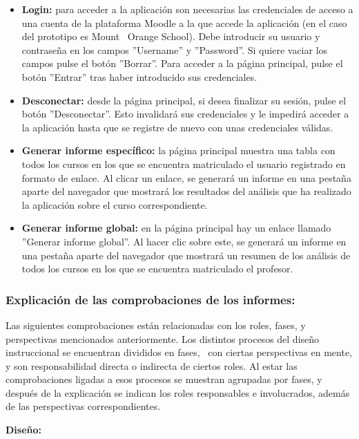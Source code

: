 \begin{itemize}
	\item
	\textbf{Login:} para acceder a la aplicación son necesarias las
	credenciales de acceso a una cuenta de la plataforma Moodle a la que
	accede la aplicación (en el caso del prototipo es Mount ~Orange
	School). Debe introducir su usuario y contraseña en los campos
	''Username'' y ''Password''. Si quiere vaciar los campos pulse el botón
	''Borrar''. Para acceder a la página principal, pulse el botón ''Entrar''
	tras haber introducido sus credenciales.
	\item
	\textbf{Desconectar:} desde la página principal, si desea finalizar su
	sesión, pulse el botón ''Desconectar''. Esto invalidará sus credenciales
	y le impedirá acceder a la aplicación hasta que se registre de nuevo
	con unas credenciales válidas.
	\item
	\textbf{Generar informe específico:} la página principal muestra una
	tabla con todos los cursos en los que se encuentra matriculado el
	usuario registrado en formato de enlace. Al clicar un enlace, se
	generará un informe en una pestaña aparte del navegador que mostrará
	los resultados del análisis que ha realizado la aplicación sobre el
	curso correspondiente.
	\item
	\textbf{Generar informe global:} en la página principal hay un enlace
	llamado ''Generar informe global''. Al hacer clic sobre este, se
	generará un informe en una pestaña aparte del navegador que mostrará
	un resumen de los análisis de todos los cursos en los que se encuentra
	matriculado el profesor.
\end{itemize}

\subsubsection{Explicación de las comprobaciones de los informes:}

Las siguientes comprobaciones están relacionadas con los roles, fases, y
perspectivas mencionados anteriormente. Los distintos procesos del
diseño instruccional se encuentran divididos en fases, ~con ciertas
perspectivas en mente, y son responsabilidad directa o indirecta de
ciertos roles. Al estar las comprobaciones ligadas a esos procesos se
muestran agrupadas por fases, y después de la explicación se indican los
roles responsables e involucrados, además de las perspectivas
correspondientes.

\textbf{Diseño:}

